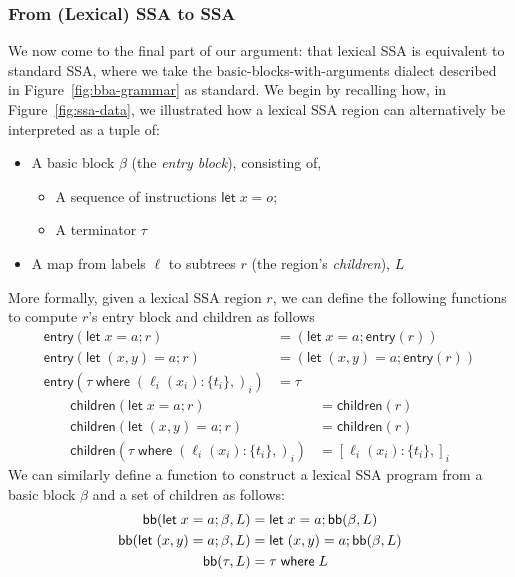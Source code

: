 \documentclass[acmsmall,screen,review]{acmart}
\newcommand{\ms}[1]{\ensuremath{\mathsf{#1}}}
\newcommand{\lto}{:}
\newcommand{\letstmt}[3]{\ensuremath{\ms{let}\;#1 = #2; #3}}
\newcommand{\where}[2]{#1\;\ms{where}\;#2}
\newcommand{\wbranch}[3]{#1(#2) \lto \{#3\}}
\newcommand{\toentry}[1]{\ms{entry}(#1)}
\newcommand{\todom}[1]{\ms{children}(#1)}
\newcommand{\adddom}[2]{\ms{bb}(#1, #2)}
\begin{document}
\subsubsection{From (Lexical) SSA to SSA}

We now come to the final part of our argument: that lexical SSA is equivalent to standard SSA, where
we take the basic-blocks-with-arguments dialect described in Figure~\ref{fig:bba-grammar} as
standard. We begin by recalling how, in Figure~\ref{fig:ssa-data}, we illustrated how a lexical SSA
region can alternatively be interpreted as a tuple of: 
\begin{itemize}
  \item A basic block $\beta$ (the \emph{entry block}), consisting of,
  \begin{itemize}
    \item A sequence of instructions $\letstmt{x}{o}{}$
    \item A terminator $\tau$
  \end{itemize}
  \item A map from labels $\ell$ to subtrees $r$ (the region's \emph{children}), $L$
\end{itemize}
More formally, given a lexical SSA region $r$, we can define the following functions to compute
$r$'s entry block and children as follows
\begin{equation}
  \begin{aligned}
    \toentry{\letstmt{x}{a}{r}} &= (\letstmt{x}{a}{\toentry{r}}) \\
    \toentry{\letstmt{(x, y)}{a}{r}} &= (\letstmt{(x, y)}{a}{\toentry{r}}) \\
    \toentry{\where{\tau}{(\wbranch{\ell_i}{x_i}{t_i},)_i}} &= \tau
  \end{aligned}
\end{equation}
\begin{equation}
  \begin{aligned}
    \todom{\letstmt{x}{a}{r}} &= \todom{r} \\
    \todom{\letstmt{(x, y)}{a}{r}} &= \todom{r} \\
    \todom{\where{\tau}{(\wbranch{\ell_i}{x_i}{t_i},)_i}} &= [\wbranch{\ell_i}{x_i}{t_i},]_i
  \end{aligned}
\end{equation}
We can similarly define a function to construct a lexical SSA program from a basic block $\beta$ and
a set of children as follows:
\begin{equation}
  \begin{aligned}
  \adddom{\letstmt{x}{a}{\beta}}{L} &= \letstmt{x}{a}{\adddom{\beta}}{L} \\
  \adddom{\letstmt{(x, y)}{a}{\beta}}{L} &= \letstmt{(x, y)}{a}{\adddom{\beta}}{L} \\
  \adddom{\tau}{L} &= \where{\tau}{L}
  \end{aligned}
\end{equation}
\end{document}

